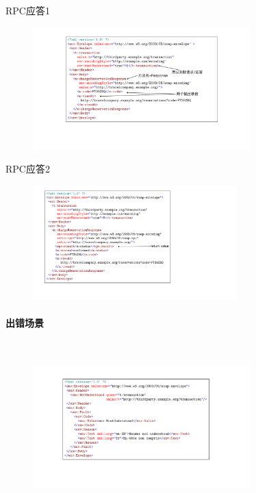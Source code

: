 RPC应答1
\begin{figure}[H]
    \vspace{-0.5em}
	\centering
	\includegraphics[width=0.75\textwidth]{images/RPC1.pdf}
    \vspace{-1em}
\end{figure}

RPC应答2
\begin{figure}[H]
    \vspace{-0.5em}
	\centering
	\includegraphics[width=0.7\textwidth]{images/RPC2.pdf}
    \vspace{-1em}
\end{figure}

\paragraph*{出错场景}~{} \par
\begin{figure}[H]
    \vspace{-0.5em}
	\centering
	\includegraphics[width=0.75\textwidth]{images/Fault Scenarios.pdf}
    \vspace{-3em}
\end{figure}

